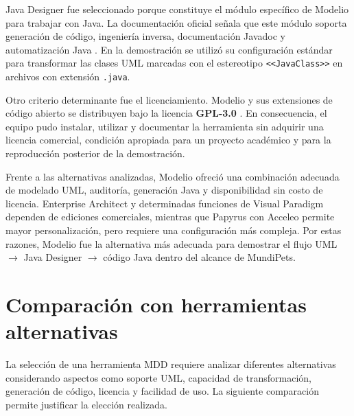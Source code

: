 \documentclass[10pt,a4paper,openany]{report}
\begin{document}
	Java Designer fue seleccionado porque constituye el módulo específico
	de Modelio para trabajar con Java. La documentación oficial señala que
	este módulo soporta generación de código, ingeniería inversa,
	documentación Javadoc y automatización Java
	\cite{modelioJavaDesigner}. En la demostración se utilizó su
	configuración estándar para transformar las clases UML marcadas con el
	estereotipo
	\texttt{\textless\textless JavaClass\textgreater\textgreater}
	en archivos con extensión \texttt{.java}.
	
	Otro criterio determinante fue el licenciamiento. Modelio y sus
	extensiones de código abierto se distribuyen bajo la licencia
	\textbf{GPL-3.0}
	\cite{modelioLicencia}. En consecuencia, el equipo pudo instalar,
	utilizar y documentar la herramienta sin adquirir una licencia
	comercial, condición apropiada para un proyecto académico y para la
	reproducción posterior de la demostración.
	
	Frente a las alternativas analizadas, Modelio ofreció una combinación
	adecuada de modelado UML, auditoría, generación Java y disponibilidad
	sin costo de licencia. Enterprise Architect y determinadas funciones de
	Visual Paradigm dependen de ediciones comerciales, mientras que
	Papyrus con Acceleo permite mayor personalización, pero requiere una
	configuración más compleja. Por estas razones, Modelio fue la alternativa
	más adecuada para demostrar el flujo
	UML $\rightarrow$ Java Designer $\rightarrow$ código Java dentro del
	alcance de MundiPets.
	
	\section{Comparación con herramientas alternativas}
	
	La selección de una herramienta MDD requiere analizar diferentes alternativas 
	considerando aspectos como soporte UML, capacidad de transformación, generación 
	de código, licencia y facilidad de uso. La siguiente comparación permite 
	justificar la elección realizada.
	
\end{document}
